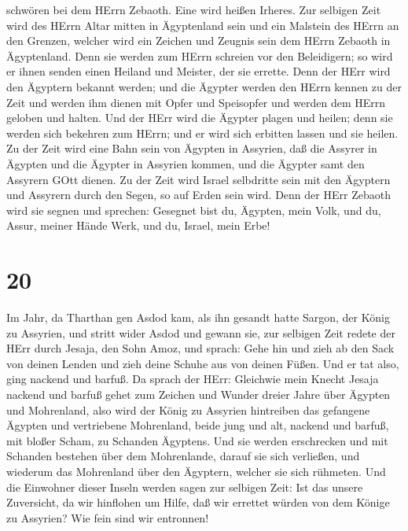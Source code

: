 schwören bei dem HErrn Zebaoth. Eine wird heißen Irheres. 
Zur selbigen Zeit wird des HErrn Altar mitten in Ägyptenland sein und
ein Malstein des HErrn an den Grenzen,  welcher wird ein
Zeichen und Zeugnis sein dem HErrn Zebaoth in Ägyptenland. Denn sie
werden zum HErrn schreien vor den Beleidigern; so wird er ihnen senden
einen Heiland und Meister, der sie errette.  Denn der HErr
wird den Ägyptern bekannt werden; und die Ägypter werden den HErrn
kennen zu der Zeit und werden ihm dienen mit Opfer und Speisopfer und
werden dem HErrn geloben und halten.  Und der HErr wird die
Ägypter plagen und heilen; denn sie werden sich bekehren zum HErrn; und
er wird sich erbitten lassen und sie heilen.  Zu der Zeit
wird eine Bahn sein von Ägypten in Assyrien, daß die Assyrer in Ägypten
und die Ägypter in Assyrien kommen, und die Ägypter samt den Assyrern
GOtt dienen.  Zu der Zeit wird Israel selbdritte sein mit
den Ägyptern und Assyrern durch den Segen, so auf Erden sein wird.
 Denn der HErr Zebaoth wird sie segnen und sprechen:
Gesegnet bist du, Ägypten, mein Volk, und du, Assur, meiner Hände Werk,
und du, Israel, mein Erbe!

\hypertarget{section-19}{%
\section{20}\label{section-19}}

 Im Jahr, da Tharthan gen Asdod kam, als ihn gesandt hatte
Sargon, der König zu Assyrien, und stritt wider Asdod und gewann sie,
 zur selbigen Zeit redete der HErr durch Jesaja, den Sohn
Amoz, und sprach: Gehe hin und zieh ab den Sack von deinen Lenden und
zieh deine Schuhe aus von deinen Füßen. Und er tat also, ging nackend
und barfuß.  Da sprach der HErr: Gleichwie mein Knecht
Jesaja nackend und barfuß gehet zum Zeichen und Wunder dreier Jahre über
Ägypten und Mohrenland,  also wird der König zu Assyrien
hintreiben das gefangene Ägypten und vertriebene Mohrenland, beide jung
und alt, nackend und barfuß, mit bloßer Scham, zu Schanden Ägyptens.
 Und sie werden erschrecken und mit Schanden bestehen über
dem Mohrenlande, darauf sie sich verließen, und wiederum das Mohrenland
über den Ägyptern, welcher sie sich rühmeten.  Und die
Einwohner dieser Inseln werden sagen zur selbigen Zeit: Ist das unsere
Zuversicht, da wir hinflohen um Hilfe, daß wir errettet würden von dem
Könige zu Assyrien? Wie fein sind wir entronnen!

